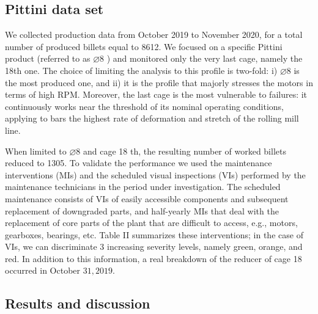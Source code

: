 \subsection{Pittini data set}
We collected production data from October 2019 to November 2020, for a total number of produced billets equal to 8612. We focused on a specific Pittini product (referred to as $\varnothing 8$ ) and monitored only the very last cage, namely the 18th one. The choice of limiting the analysis to this profile is two-fold: i) $\varnothing 8$ is the most produced one, and ii) it is the profile that majorly stresses the motors in terms of high RPM. Moreover, the last cage is the most vulnerable to failures: it continuously works near the threshold of its nominal operating conditions, applying to bars the highest rate of deformation and stretch of the rolling mill line.

When limited to $\varnothing 8$ and cage 18 th, the resulting number of worked billets reduced to 1305. To validate the performance we used the maintenance interventions (MIs) and the scheduled visual inspections (VIs) performed by the maintenance technicians in the period under investigation. The scheduled maintenance consists of VIs of easily accessible components and subsequent replacement of downgraded parts, and half-yearly MIs that deal with the replacement of core parts of the plant that are difficult to access, e.g., motors, gearboxes, bearings, etc. Table II summarizes these interventions; in the case of VIs, we can discriminate 3 increasing severity levels, namely green, orange, and red. In addition to this information, a real breakdown of the reducer of cage 18 occurred in October $31,2019$.
\subsection{Results and discussion}

